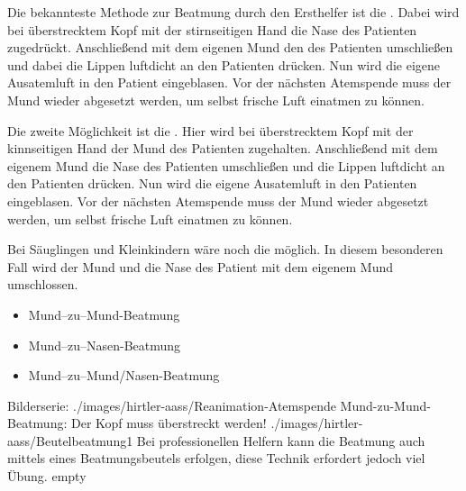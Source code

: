 {
Die bekannteste Methode zur Beatmung durch den Ersthelfer
ist die . Dabei wird bei
überstrecktem Kopf mit der stirnseitigen Hand die Nase des
Patienten zugedrückt. Anschließend mit dem eigenen Mund den
des Patienten umschließen und dabei die Lippen luftdicht an
den Patienten drücken. Nun wird die eigene Ausatemluft in
den Patient eingeblasen. Vor der nächsten Atemspende muss
der Mund wieder abgesetzt werden, um selbst frische Luft
einatmen zu können.

Die zweite Möglichkeit ist die .
Hier wird bei überstrecktem Kopf mit der kinnseitigen Hand
der Mund des Patienten zugehalten. Anschließend mit dem
eigenem Mund die Nase des Patienten umschließen und die
Lippen luftdicht an den Patienten drücken. Nun wird die
eigene Ausatemluft in den Patienten eingeblasen. Vor der
nächsten Atemspende muss der Mund wieder abgesetzt werden,
um selbst frische Luft einatmen zu können.

Bei Säuglingen und Kleinkindern wäre noch die
 möglich. In diesem
besonderen Fall wird der Mund und die Nase des Patient mit
dem eigenem Mund umschlossen.
}{
\begin{itemize}
  \item Mund--zu--Mund-Beatmung
  \item Mund--zu--Nasen-Beatmung
  \item Mund--zu--Mund/Nasen-Beatmung
\end{itemize}
}{}{}{}

\begin{PictureSeries}{}{Bilderserie:
}
{./images/hirtler-aass/Reanimation-Atemspende}
{Mund-zu-Mund-Beatmung: Der Kopf muss
überstreckt werden!}
{./images/hirtler-aass/Beutelbeatmung1}
{Bei professionellen Helfern kann die Beatmung auch mittels
eines Beatmungsbeutels erfolgen, diese Technik erfordert
jedoch viel Übung.}
{empty}
{}
{}
{}
\end{PictureSeries}


